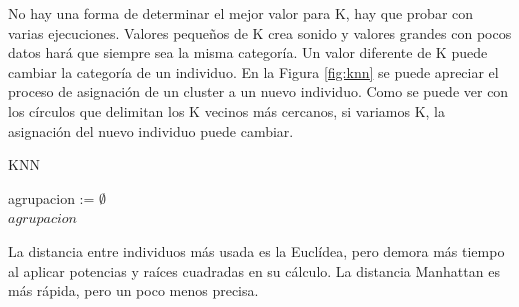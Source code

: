 No hay una forma de determinar el mejor valor para K, hay que probar con varias ejecuciones. Valores pequeños de K crea sonido y valores grandes con pocos datos hará que siempre sea la misma categoría. Un valor diferente de K puede cambiar la categoría de un individuo. En la Figura \ref{fig:knn} se puede apreciar el proceso de asignación de un cluster a un nuevo individuo. Como se puede ver con los círculos que delimitan los K vecinos más cercanos, si variamos K, la asignación del nuevo individuo puede cambiar.

\begin{algorithm}
	\caption{KNN}
	agrupacion := $\emptyset$\\
	\Return $agrupacion$\;
\end{algorithm}

La distancia entre individuos más usada es la Euclídea, pero demora más tiempo al aplicar potencias y raíces cuadradas en su cálculo. La distancia Manhattan es más rápida, pero un poco menos precisa.

\newpage



